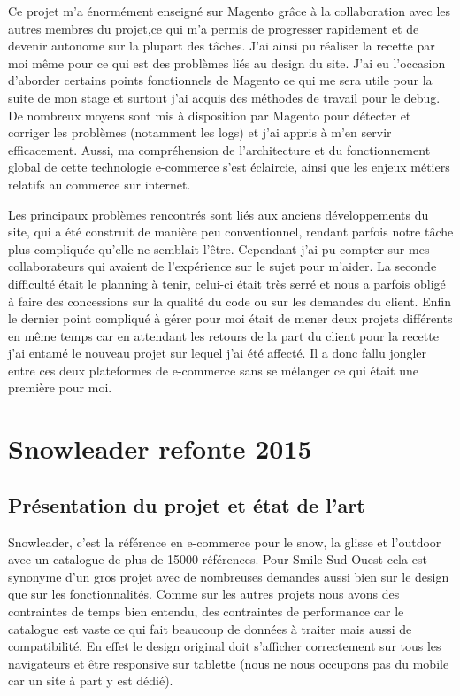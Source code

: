 \documentclass[a4paper,11pt,twoside]{report}
\begin{document}
    Ce projet m'a énormément enseigné sur Magento grâce à la collaboration avec les autres membres du projet,ce qui m'a permis de progresser rapidement et de devenir autonome sur la plupart des tâches. J'ai ainsi pu réaliser la recette par moi même pour ce qui est des problèmes liés au design du site. J'ai eu l'occasion d'aborder certains points fonctionnels de Magento ce qui me sera utile pour la suite de mon stage et surtout j'ai acquis des méthodes de travail pour le debug. De nombreux moyens sont mis à disposition par Magento pour détecter et corriger les problèmes (notamment les logs) et j'ai appris à m'en servir efficacement. Aussi, ma compréhension de l'architecture et du fonctionnement global de cette technologie e-commerce s'est éclaircie, ainsi que les enjeux métiers relatifs au commerce sur internet.
    
    Les principaux problèmes rencontrés sont liés aux anciens développements du site, qui a été construit de manière peu conventionnel, rendant parfois notre tâche plus compliquée qu'elle ne semblait l'être. Cependant j'ai pu compter sur mes collaborateurs qui avaient de l'expérience sur le sujet pour m'aider. La seconde difficulté était le planning à tenir, celui-ci était très serré et nous a parfois obligé à faire des concessions sur la qualité du code ou sur les demandes du client. Enfin le dernier point compliqué à gérer pour moi était de mener deux projets différents en même temps car en attendant les retours de la part du client pour la recette j'ai entamé le nouveau projet sur lequel j'ai été affecté. Il a donc fallu jongler entre ces deux plateformes de e-commerce sans se mélanger ce qui était une première pour moi.   
    
        \newpage
    
  \section{Snowleader refonte 2015}
    \subsection*{Présentation du projet et état de l'art}
    Snowleader, c'est la référence en e-commerce pour le snow, la glisse et l'outdoor avec un catalogue de plus de 15000 références. Pour Smile Sud-Ouest cela est synonyme d'un gros projet avec de nombreuses demandes aussi bien sur le design que sur les fonctionnalités. Comme sur les autres projets nous avons des contraintes de temps bien entendu, des contraintes de performance car le catalogue est vaste ce qui fait beaucoup de données à traiter mais aussi de compatibilité. En effet le design original doit s'afficher correctement sur tous les navigateurs et être responsive sur tablette (nous ne nous occupons pas du mobile car un site à part y est dédié). 
    
\end{document}
